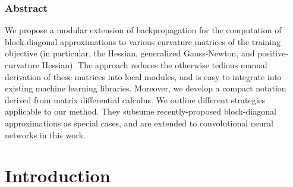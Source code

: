 \subsubsection{Abstract}

We propose a modular extension of backpropagation for the computation of
block-diagonal approximations to various curvature matrices of the training
objective (in particular, the Hessian, generalized Gauss-Newton, and
positive-curvature Hessian). The approach reduces the otherwise tedious manual
derivation of these matrices into local modules, and is easy to integrate into
existing machine learning libraries. Moreover, we develop a compact notation
derived from matrix differential calculus. We outline different strategies
applicable to our method. They subsume recently-proposed block-diagonal
approximations as special cases, and are extended to convolutional neural
networks in this work.


\section{Introduction}


